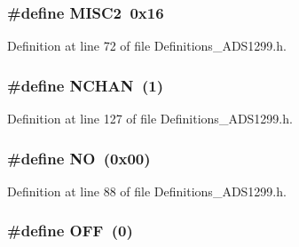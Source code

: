 \subsubsection[{\texorpdfstring{M\+I\+S\+C2}{MISC2}}]{\setlength{\rightskip}{0pt plus 5cm}\#define M\+I\+S\+C2~0x16}\hypertarget{group__Definitions__ADS1299_gaae8dcec655baaec75ee902fdb31ef73d}{}\label{group__Definitions__ADS1299_gaae8dcec655baaec75ee902fdb31ef73d}


Definition at line 72 of file Definitions\+\_\+\+A\+D\+S1299.\+h.

\subsubsection[{\texorpdfstring{N\+C\+H\+AN}{NCHAN}}]{\setlength{\rightskip}{0pt plus 5cm}\#define N\+C\+H\+AN~(1)}\hypertarget{group__Definitions__ADS1299_ga3e9ad0441ab60e69a8b9d23efd7ddde8}{}\label{group__Definitions__ADS1299_ga3e9ad0441ab60e69a8b9d23efd7ddde8}


Definition at line 127 of file Definitions\+\_\+\+A\+D\+S1299.\+h.

\subsubsection[{\texorpdfstring{NO}{NO}}]{\setlength{\rightskip}{0pt plus 5cm}\#define NO~(0x00)}\hypertarget{group__Definitions__ADS1299_ga996bde01ecac342918f0a2c4e7ce7bd5}{}\label{group__Definitions__ADS1299_ga996bde01ecac342918f0a2c4e7ce7bd5}


Definition at line 88 of file Definitions\+\_\+\+A\+D\+S1299.\+h.

\subsubsection[{\texorpdfstring{O\+FF}{OFF}}]{\setlength{\rightskip}{0pt plus 5cm}\#define O\+FF~(0)}\hypertarget{group__Definitions__ADS1299_ga29e413f6725b2ba32d165ffaa35b01e5}{}\label{group__Definitions__ADS1299_ga29e413f6725b2ba32d165ffaa35b01e5}



